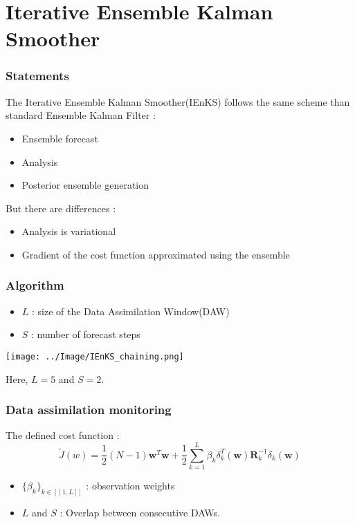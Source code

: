 \documentclass{beamer}
\begin{document}
\section{Iterative Ensemble Kalman Smoother}
\begin{frame}
\frametitle{Statements}
The Iterative Ensemble Kalman Smoother(IEnKS) follows the same scheme than standard Ensemble Kalman Filter :
\begin{itemize}
\item Ensemble forecast
\item Analysis
\item Posterior ensemble generation
\end{itemize}

But there are differences :
\begin{itemize}
\item  Analysis is variational
\item  Gradient of the cost function approximated using the ensemble
\end{itemize}
\end{frame}

\begin{frame}
\frametitle{Algorithm}
\begin{itemize}
\item $L$ : size of the Data Assimilation Window(DAW)
\item $S$ : number of forecast steps
\end{itemize}
\begin{center}
\texttt{[image: ../Image/IEnKS\_chaining.png]} 
\end{center}
Here, $L=5$ and $S=2$.
\end{frame}


\begin{frame}
\frametitle{Data assimilation monitoring}
The defined cost function :
$$\tilde{J}(w) = \frac{1}{2}(N-1)\textbf{w}^{T}\textbf{w} + \frac{1}{2}\sum_{k=1}^{L}\beta_{k}\delta_{k}^{T}(\textbf{w})\textbf{R}_{k}^{-1}\delta_{k}(\textbf{w})$$

\begin{itemize}
\item $\{\beta_k\}_{k \in [\![1,L]\!]}$ : observation weights
\item $L$ and $S$ : Overlap between consecutive DAWs.
\end{itemize}
\end{frame}
\end{document}
